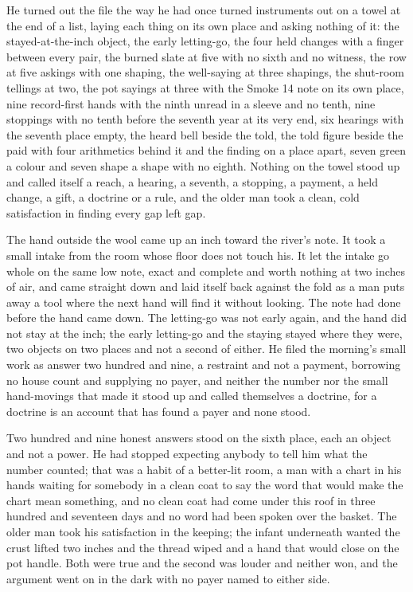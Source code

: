 He turned out the file the way he had once turned instruments out on a towel at the end of a list, laying each thing on its own place and asking nothing of it: the stayed-at-the-inch object, the early letting-go, the four held changes with a finger between every pair, the burned slate at five with no sixth and no witness, the row at five askings with one shaping, the well-saying at three shapings, the shut-room tellings at two, the pot sayings at three with the Smoke 14 note on its own place, nine record-first hands with the ninth unread in a sleeve and no tenth, nine stoppings with no tenth before the seventh year at its very end, six hearings with the seventh place empty, the heard bell beside the told, the told figure beside the paid with four arithmetics behind it and the finding on a place apart, seven green a colour and seven shape a shape with no eighth. Nothing on the towel stood up and called itself a reach, a hearing, a seventh, a stopping, a payment, a held change, a gift, a doctrine or a rule, and the older man took a clean, cold satisfaction in finding every gap left gap.

\scenebreak

The hand outside the wool came up an inch toward the river's note. It took a small intake from the room whose floor does not touch his. It let the intake go whole on the same low note, exact and complete and worth nothing at two inches of air, and came straight down and laid itself back against the fold as a man puts away a tool where the next hand will find it without looking. The note had done before the hand came down. The letting-go was not early again, and the hand did not stay at the inch; the early letting-go and the staying stayed where they were, two objects on two places and not a second of either. He filed the morning's small work as answer two hundred and nine, a restraint and not a payment, borrowing no house count and supplying no payer, and neither the number nor the small hand-movings that made it stood up and called themselves a doctrine, for a doctrine is an account that has found a payer and none stood.

Two hundred and nine honest answers stood on the sixth place, each an object and not a power. He had stopped expecting anybody to tell him what the number counted; that was a habit of a better-lit room, a man with a chart in his hands waiting for somebody in a clean coat to say the word that would make the chart mean something, and no clean coat had come under this roof in three hundred and seventeen days and no word had been spoken over the basket. The older man took his satisfaction in the keeping; the infant underneath wanted the crust lifted two inches and the thread wiped and a hand that would close on the pot handle. Both were true and the second was louder and neither won, and the argument went on in the dark with no payer named to either side.

